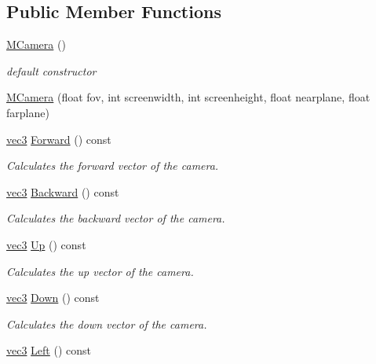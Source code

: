 \subsection*{Public Member Functions}
\begin{DoxyCompactItemize}
\item 
\hyperlink{class_m_camera_aeb31dba292ce873c389d6082f9bd38e6}{M\+Camera} ()
\begin{DoxyCompactList}\small\item\em default constructor \end{DoxyCompactList}\item 
\hyperlink{class_m_camera_afd10328b7ca597a494b347b12904bcda}{M\+Camera} (float fov, int screenwidth, int screenheight, float nearplane, float farplane)
\item 
\hyperlink{_types_8h_a3d0ce73e3199de81565fb01632415288}{vec3} \hyperlink{class_m_camera_aa1da16fdb2e87fa0d4b06651b832fb8b}{Forward} () const 
\begin{DoxyCompactList}\small\item\em Calculates the forward vector of the camera. \end{DoxyCompactList}\item 
\hyperlink{_types_8h_a3d0ce73e3199de81565fb01632415288}{vec3} \hyperlink{class_m_camera_a0f5e90744e9d50492c2751c68f307eae}{Backward} () const 
\begin{DoxyCompactList}\small\item\em Calculates the backward vector of the camera. \end{DoxyCompactList}\item 
\hyperlink{_types_8h_a3d0ce73e3199de81565fb01632415288}{vec3} \hyperlink{class_m_camera_a315ae964f137919c9f285e6fcad0c2c1}{Up} () const 
\begin{DoxyCompactList}\small\item\em Calculates the up vector of the camera. \end{DoxyCompactList}\item 
\hyperlink{_types_8h_a3d0ce73e3199de81565fb01632415288}{vec3} \hyperlink{class_m_camera_a31bf2dae9dd70fce430afa8342a60b7a}{Down} () const 
\begin{DoxyCompactList}\small\item\em Calculates the down vector of the camera. \end{DoxyCompactList}\item 
\hyperlink{_types_8h_a3d0ce73e3199de81565fb01632415288}{vec3} \hyperlink{class_m_camera_aa8ce7afc3ce3daa0d4d95a3deab311a2}{Left} () const 

\end{DoxyCompactItemize}
